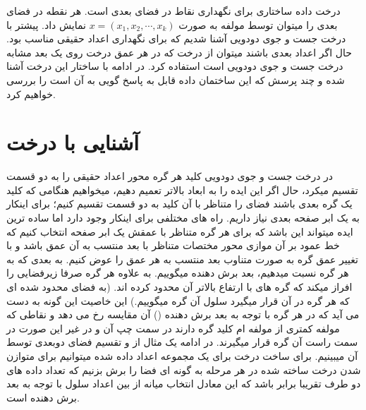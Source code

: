 \documentclass[11pt]{article}
\begin{document}
درخت 
داده ساختاری برای نگهداری نقاط در فضای 
بعدی است. هر نقطه در فضای 
بعدی را میتوان توسط 
مولفه به صورت 
$x = (x_1, x_2, \cdots, x_k)$
نمایش داد. 
پیشتر با درخت جست و جوی دودویی آشنا شدیم که برای نگهداری اعداد حقیقی مناسب بود. حال اگر اعداد 
بعدی باشند میتوان از درخت 
که در هر عمق درخت روی یک بعد مشابه درخت جست و جوی دودویی است استفاده کرد.
در ادامه با ساختار این درخت آشنا شده و چند پرسش
که این ساختمان داده قابل به پاسخ گویی به آن است را بررسی خواهیم کرد.
\section{آشنایی با درخت }
در درخت جست و جوی دودویی کلید هر گره محور اعداد حقیقی را به دو قسمت تقسیم میکرد، حال اگر این ایده را به ابعاد بالاتر تعمیم دهیم، میخواهیم هنگامی که کلید یک گره 
بعدی باشند فضای 
را متناظر با آن کلید به دو قسمت تقسیم کنیم؛ برای اینکار به یک ابر صفحه 
بعدی
نیاز داریم.
راه های مختلفی برای اینکار وجود دارد اما ساده ترین ایده میتواند این باشد که برای هر گره متناظر با عمقش یک ابر صفحه انتخاب کنیم که خط عمود بر آن موازی محور مختصات متناظر با بعد منتسب به آن عمق باشد و با تغییر عمق گره به صورت متناوب بعد منتسب به هر عمق را عوض کنیم.
به بعدی که به هر گره نسبت میدهیم، بعد برش دهنده 
میگوییم.
به علاوه هر گره صرفا زیرفضایی را افراز میکند که گره های با ارتفاع بالاتر آن محدود کرده اند. (به فضای محدود شده ای که هر گره در آن قرار میگیرد سلول آن گره 
میگوییم.)
این خاصیت این گونه به دست می آید که در هر گره با توجه به بعد برش دهنده
()
آن مقایسه رخ می دهد و نقاطی که مولفه 
کمتری از مولفه 
ام کلید گره
دارند در سمت چپ آن و در غیر این صورت در سمت راست آن گره قرار میگیرند. 
در ادامه یک مثال از 
و تقسیم فضای دوبعدی توسط آن میبینیم.
برای ساخت درخت برای یک مجموعه اعداد داده شده میتوانیم برای متوازن شدن درخت ساخته شده در هر مرحله به گونه ای فضا را برش بزنیم که تعداد داده های دو طرف تقریبا برابر باشد که این معادل انتخاب میانه از بین اعداد سلول با توجه به بعد برش دهنده است. 
\\
\end{document}
